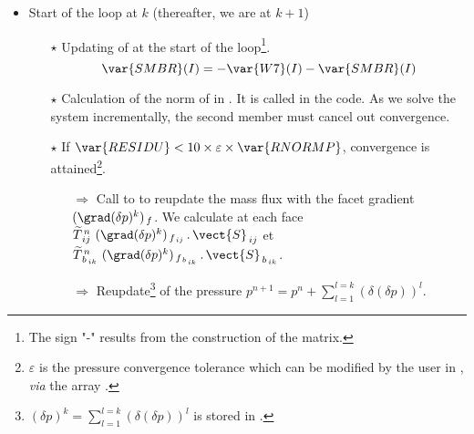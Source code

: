 \begin{itemize}

\item Start of the loop at $k$ (thereafter, we are at $k+1$)

\begin{itemize}

\item[$\star$] Updating of  at the start of the loop\footnote{The sign "-" results from the construction of the matrix.}.
$$ \var{SMBR}(I) = -\var{W7}(I) - \var{SMBR}(I) $$

\item[$\star$] Calculation of the norm of  in . It is called  in the code. As we solve the system incrementally, the second member must cancel out convergence.
\item[$\star$] If $ \var{RESIDU} < 10 \times \varepsilon \times \var{RNORMP}$, convergence is attained\footnote{$\varepsilon$ is the pressure convergence tolerance which can be modified by the user in , {\it via} the array .}.
\begin{itemize}
\item[$\Rightarrow$] Call to  to reupdate the mass flux with the facet gradient $(\grad (\delta p)^k)_{\,f}$. We calculate at each face $\widetilde{T}^{\,n}_{\,ij}\ (\grad(\delta p)^k)_{\,f_{\,ij}}\,.\,\vect{S}_{\,ij}$ et $\widetilde{T}^{\,n}_{\,b_{\,ik}}\ (\grad(\delta p)^k)_{\,f_{\,b_{\,ik}}}\,.\,\vect{S}_{\,b_{\,ik}}$.

\item[$\Rightarrow$] Reupdate\footnote{$(\delta p)^k = \sum\limits_{l=1}^{l=k} (\delta(\delta p))^l $ is stored in .} of the pressure $p^{n+1} = p^{n} + \sum\limits_{l=1}^{l=k} (\delta(\delta p))^l$.
\end{itemize}


\end{itemize}
\end{itemize}
